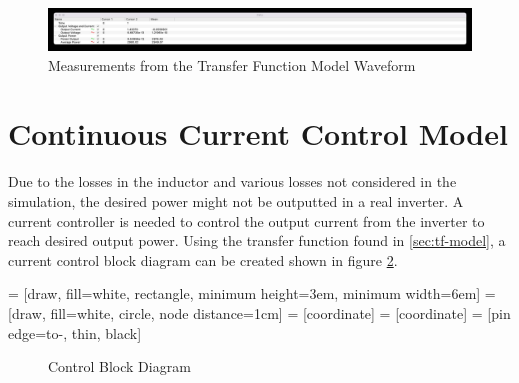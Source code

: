 \documentclass[12pt]{article}
\begin{document}
\begin{figure}[ht]
    \centering{}
    \includegraphics[width=\textwidth, height=0.4\textheight, keepaspectratio]{img/Transfer Function Cursor.jpg}
    \caption{Measurements from the Transfer Function Model Waveform}
    \label{fig:tf-cursor}
\end{figure}

\section{Continuous Current Control Model}
\label{sec:cont-cc-model}

Due to the losses in the inductor and various losses not considered in the simulation, the desired power might not be outputted in a real inverter.
A current controller is needed to control the output current from the inverter to reach desired output power.
Using the transfer function found in \ref{sec:tf-model}, a current control block diagram can be created shown in figure \ref{fig:control-block-diagram}.

 = [draw, fill=white, rectangle,
minimum height=3em, minimum width=6em]
 = [draw, fill=white, circle, node distance=1cm]
 = [coordinate]
 = [coordinate]
 = [pin edge={to-, thin, black}]

\begin{figure}
    \centering{}
    \caption{Control Block Diagram}
    \label{fig:control-block-diagram}
\end{figure}
\end{document}
